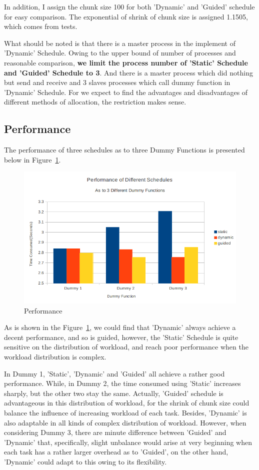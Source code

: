 \documentclass[a4paper]{article}   %
\begin{document}
\begin{CJK}{UTF8}{gbsn}
\begin{spacing}{1.2}
In addition, I assign the chunk size 100 for both 'Dynamic' and 'Guided' schedule for easy comparison. The exponential of shrink of chunk size is assigned 1.1505, which comes from tests.

What should be noted is that there is a master process in the implement of 'Dynamic' Schedule. Owing to the upper bound of number of processes and reasonable comparison, \textbf{we limit the process number of 'Static' Schedule and 'Guided' Schedule to 3}. And there is a master process which did nothing but send and receive and 3 slaves processes which call dummy function in 'Dynamic' Schedule. For we expect to find the advantages and disadvantages of different methods of allocation, the restriction makes sense.

\subsection{Performance}
The performance of three schedules as to three Dummy Functions is presented below in Figure~\ref{fig:prob2_performance}.
\begin{figure}[htbp]
\centering
\includegraphics[width=12cm]{figs/prob2_performance.png}
\caption{Performance}
\label{fig:prob2_performance}
\end{figure}

As is shown in the Figure~\ref{fig:prob2_performance}, we could find that 'Dynamic' always achieve a decent performance, and so is guided, however, the 'Static' Schedule is quite sensitive on the distribution of workload, and reach poor performance when the workload distribution is complex. 

In Dummy 1, 'Static', 'Dynamic' and 'Guided' all achieve a rather good performance. While, in Dummy 2, the time consumed using 'Static' increases sharply, but the other two stay the same. Actually, 'Guided' schedule is advantageous in this distribution of workload, for the shrink of chunk size could balance the influence of increasing workload of each task. Besides, 'Dynamic' is also adaptable in all kinds of complex distribution of workload. However, when considering Dummy 3, there are minute difference between 'Guided' and 'Dynamic' that, specifically, slight unbalance would arise at very beginning when each task has a rather larger overhead as to 'Guided', on the other hand, 'Dynamic' could adapt to this owing to its flexibility. 

\end{spacing}
\end{CJK}
\end{document}
